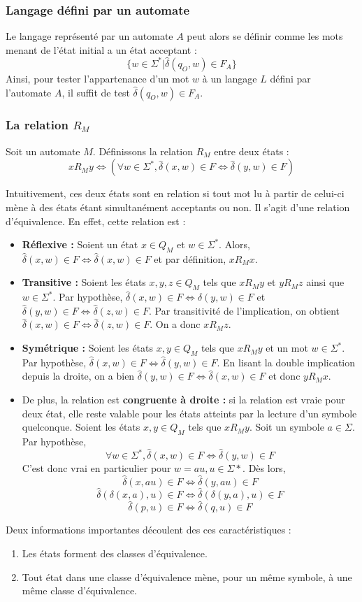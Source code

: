 	 \subsubsection{Langage défini par un automate}
	 
	 Le langage représenté par un automate $A$ peut alors se définir comme les mots menant de l'état initial a un état acceptant :
	 $$
	 \{w \in \Sigma^* | \hat{\delta}(q_O,w) \in F_A\}
	 $$
	 Ainsi, pour tester l'appartenance d'un mot $w$ à un langage $L$ défini par l'automate $A$, il suffit de test $\hat{\delta}(q_O,w) \in F_A$.
	 
	 \subsubsection{La relation $R_M$}\label{ss:rm}
	 
	 Soit un automate $M$. Définissons la relation $R_M$ entre deux états : $$xR_My \iff (\forall w \in \Sigma^*, \hat{\delta}(x,w) \in F \iff \hat{\delta}(y,w) \in F)$$
	 
	 Intuitivement, ces deux états sont en relation si tout mot lu à partir de celui-ci mène à des états étant simultanément acceptants ou non. Il s'agit d'une relation d'équivalence. En effet, cette relation est :
	 
	 \begin{itemize}
	 	\item \textbf{Réflexive :} Soient un état $x \in Q_M$ et $w \in \Sigma^*$. Alors, $\hat{\delta}(x,w) \in F \iff \hat{\delta}(x,w) \in F$ et par définition, $xR_Mx$.
	 	\item \textbf{Transitive :} Soient les états $x,y,z \in Q_M$ tels que $xR_My$ et $yR_Mz$ ainsi que $w \in \Sigma^*$. Par hypothèse, $\hat{\delta}(x,w) \in F \iff \hat{\delta}(y,w)\in F$ et $\hat{\delta}(y,w) \in F\iff \hat{\delta}(z,w) \in F$. Par transitivité de l'implication, on obtient $\hat{\delta}(x,w) \in F \iff \hat{\delta}(z,w)\in F$. On a donc $xR_Mz$.
	 	\item \textbf{Symétrique : } Soient les états $x,y \in Q_M$ tels que $xR_My$ et un mot $w \in \Sigma^*$. Par hypothèse, $\hat{\delta}(x, w)\in F \iff \hat{\delta}(y, w)\in F$. En lisant la double implication depuis la droite, on a bien $\hat{\delta}(y, w) \in F\iff \hat{\delta}(x, w)\in F$ et donc $yR_Mx$.
	 	\item De plus, la relation est \textbf{congruente à droite :} si la relation est vraie pour deux état, elle reste valable pour les états atteints par la lecture d'un symbole quelconque. Soient les états $x,y \in Q_M$ tels que $xR_My$. Soit un symbole $a \in \Sigma$. Par hypothèse, 
	 	$$\forall w \in \Sigma^*, \hat{\delta}(x, w) \in F \iff \hat{\delta}(y, w) \in F$$
	 	C'est donc vrai en particulier pour $w = au, u \in \Sigma*$. Dès lors,
	 	$$\hat{\delta}(x, au) \in F\iff \hat{\delta}(y, au)\in F$$
	 	$$\hat{\delta}(\delta(x,a),u) \in F\iff\hat{\delta}(\delta(y,a),u)\in F$$
	 	$$\hat{\delta}(p,u) \in F\iff \hat{\delta}(q,u)\in F$$
	 \end{itemize}
	 
	 Deux informations importantes découlent des ces caractéristiques : 
	 \begin{enumerate}
	 	\item Les états forment des classes d'équivalence.
	 	\item Tout état dans une classe d'équivalence mène, pour un même symbole, à une même classe d'équivalence.
	 \end{enumerate}
	 
	 